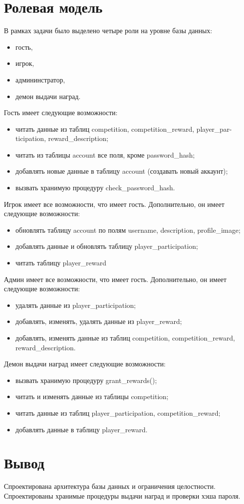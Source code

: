 \section{Ролевая модель}
В рамках задачи было выделено четыре роли на уровне базы данных:
\begin{itemize}
	\item гость,
	\item игрок,
	\item админинстратор,
	\item демон выдачи наград.
\end{itemize}
Гость имеет следующие возможности:
\begin{itemize}
	\item читать данные из таблиц competition, competition\_reward, player\_par-ticipation, reward\_description;
	\item читать из таблицы account все поля, кроме password\_hash;
	\item добавлять новые данные в таблицу account (создавать новый аккаунт);
	\item вызвать хранимую процедуру check\_password\_hash.
\end{itemize}
Игрок имеет все возможности, что имеет гость. Дополнительно, он имеет следующие возможности:
\begin{itemize}
	\item обновлять таблицу account по полям username, description, profile\_image;
	\item добавлять данные и обновлять таблицу player\_participation;
	\item читать таблицу player\_reward
\end{itemize}
Админ имеет все возможности, что имеет гость. Дополнительно, он имеет следующие возможности:
\begin{itemize}
	\item удалять данные из player\_participation;
	\item добавлять, изменять, удалять данные из player\_reward;
	\item добавлять, изменять данные из таблиц competition, competition\_reward, reward\_description.
\end{itemize}
Демон выдачи наград имеет следующие возможности:
\begin{itemize}
	\item вызвать хранимую процедуру grant\_rewards();
	\item читать и изменять данные из таблицы competition;
	\item читать данные из таблиц player\_participation, competition\_reward;
	\item добавлять данные в таблицу player\_reward.
\end{itemize}


\section*{Вывод}

Спроектирована архитектура базы данных и ограничения целостности. Спроектированы хранимые процедуры выдачи наград и проверки хэша пароля.
\clearpage
